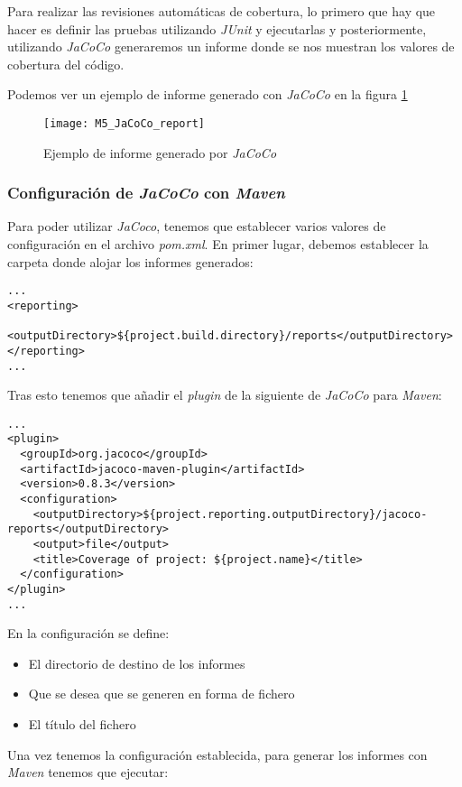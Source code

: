 Para realizar las revisiones automáticas de cobertura, lo primero que hay que hacer es definir las pruebas utilizando \textit{JUnit} y ejecutarlas y posteriormente, utilizando \textit{JaCoCo} generaremos un informe donde se nos muestran los valores de cobertura del código.

Podemos ver un ejemplo de informe generado con \textit{JaCoCo} en la figura \ref{fig:M5_JaCoCo_report}

\begin{figure}[!h]
	\centering
	\texttt{[image: M5\_JaCoCo\_report]}
	\caption{Ejemplo de informe generado por \textit{JaCoCo}}\label{fig:M5_JaCoCo_report}
\end{figure}
\FloatBarrier


\subsubsection{Configuración de \textit{JaCoCo} con \textit{Maven}}

Para poder utilizar \textit{JaCoco}, tenemos que establecer varios valores de configuración en el archivo \textit{pom.xml}. En primer lugar, debemos establecer la carpeta donde alojar los informes generados:\\
\begin{minipage}{\linewidth}
{\tiny
\begin{verbatim}
...
<reporting>
  <outputDirectory>${project.build.directory}/reports</outputDirectory>
</reporting>
...
\end{verbatim}
}
\end{minipage}

Tras esto tenemos que añadir el \textit{plugin} de la siguiente de \textit{JaCoCo} para \textit{Maven}:\\
\begin{minipage}{\linewidth}
{\tiny
\begin{verbatim}
...
<plugin>
  <groupId>org.jacoco</groupId>
  <artifactId>jacoco-maven-plugin</artifactId>
  <version>0.8.3</version>
  <configuration>
	<outputDirectory>${project.reporting.outputDirectory}/jacoco-reports</outputDirectory>
	<output>file</output>
	<title>Coverage of project: ${project.name}</title>
  </configuration>
</plugin>
...
\end{verbatim}
}
\end{minipage}
En la configuración se define:
\begin{itemize}
	\tightlist
	\item El directorio de destino de los informes
	\item Que se desea que se generen en forma de fichero
	\item El título del fichero
\end{itemize}
 Una vez tenemos la configuración establecida, para generar los informes con \textit{Maven} tenemos que ejecutar:
 
